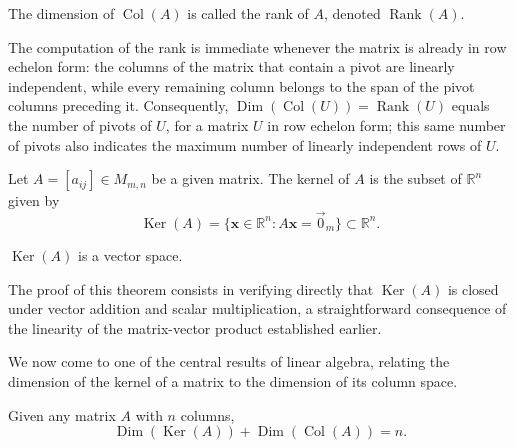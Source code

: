 \begin{definition}
The dimension of $\operatorname{Col}(A)$ is called the rank of $A$, denoted $\operatorname{Rank}(A)$.
\end{definition}

\begin{remark}
The computation of the rank is immediate whenever the matrix is already in row echelon form: the columns of the matrix that contain a pivot are linearly independent, while every remaining column belongs to the span of the pivot columns preceding it. Consequently, $\operatorname{Dim}(\operatorname{Col}(U)) = \operatorname{Rank}(U)$ equals the number of pivots of $U$, for a matrix $U$ in row echelon form; this same number of pivots also indicates the maximum number of linearly independent rows of $U$.
\end{remark}

\begin{definition}
Let $A = [a_{ij}] \in M_{m,n}$ be a given matrix. The kernel of $A$ is the subset of $\mathbb{R}^n$ given by
\[
\operatorname{Ker}(A) = \{ \mathbf{x} \in \mathbb{R}^n : A\mathbf{x} = \vec{0}_m \} \subset \mathbb{R}^n.
\]

\end{definition}

\begin{theorem}
$\operatorname{Ker}(A)$ is a vector space.
\end{theorem}

The proof of this theorem consists in verifying directly that $\operatorname{Ker}(A)$ is closed under vector addition and scalar multiplication, a straightforward consequence of the linearity of the matrix-vector product established earlier.



We now come to one of the central results of linear algebra, relating the dimension of the kernel of a matrix to the dimension of its column space.

\begin{theorem}
Given any matrix $A$ with $n$ columns,
\[
\operatorname{Dim}(\operatorname{Ker}(A)) + \operatorname{Dim}(\operatorname{Col}(A)) = n.
\]

\end{theorem}

